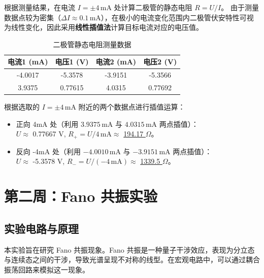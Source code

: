 \documentclass[12pt]{article}
\begin{document}
\par
\vspace{1em}
根据测量结果，在电流 $I = \pm 4\,\text{mA}$ 处计算二极管的静态电阻 $R = U/I$。
由于测量数据点较为密集（$\Delta I \approx 0.1\,\text{mA}$），在极小的电流变化范围内二极管伏安特性可视为线性变化，因此采用\textbf{线性插值法}计算目标电流对应的电压值。
\vspace{0.5em}
\begin{table}[H]
    \centering
    \caption{二极管静态电阻测量数据}
    \begin{tabular}{cc|cc}
        \toprule
        \textbf{电流1 (mA)} & \textbf{电压1 (V)} & \textbf{电流2 (mA)} & \textbf{电压2 (V)} \\
        \midrule
        -4.0017 & -5.3578 & -3.9151 & -5.3566 \\
        3.9375 & 0.77615 &  4.0315 & 0.77692 \\
        \bottomrule
    \end{tabular}
\end{table}
\vspace{0.5em}
\par
根据选取的 $I = \pm 4\,\text{mA}$ 附近的两个数据点进行插值运算：
\begin{itemize}
    \item 正向 4mA 处（利用 $3.9375\,\text{mA}$ 与 $4.0315\,\text{mA}$ 两点插值）：\\
    $U \approx$ 0.77667  V, \quad $R_{+} = U / 4\,\text{mA} \approx$ \underline{ 194.17 } $\Omega$。
    
    \item 反向 -4mA 处（利用 $-4.0010\,\text{mA}$ 与 $-3.9151\,\text{mA}$ 两点插值）：\\
    $U \approx$ -5.3578  V, \quad $R_{-} = U / (-4\,\text{mA}) \approx$ \underline{ 1339.5 } $\Omega$。
\end{itemize}

\newpage

\section{第二周：Fano 共振实验}

\subsection{实验电路与原理}

\hspace{2em}本实验旨在研究 Fano 共振现象。Fano 共振是一种量子干涉效应，表现为分立态与连续态之间的干涉，导致光谱呈现不对称的线型。在宏观电路中，可以通过耦合振荡回路来模拟这一现象。 \\
\end{document}
